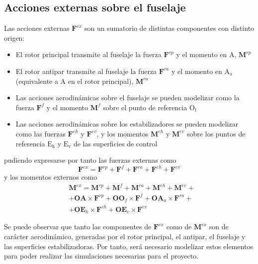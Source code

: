 \subsection{Acciones externas sobre el fuselaje}
Las acciones externas $\mathrm{\textbf{F}}^{ex}$ son un sumatorio de distintas componentes con distinto origen:
\begin{itemize}
	\item El rotor principal transmite al fuselaje la fuerza $\mathrm{\textbf{F}}^{rp}$ y el momento en $\mathrm{A}$, $\mathrm{\textbf{M}}^{rp}$
	\item El rotor antipar transmite al fuselaje la fuerza $\mathrm{\textbf{F}}^{ra}$ y el momento en $\mathrm{A_a}$ (equivalente a A en el rotor principal), $\mathrm{\textbf{M}}^{ra}$
	\item Las acciones aerodinámicas sobre el fuselaje se pueden modelizar como la fuerza $\mathrm{\textbf{F}}^{f}$ y el momento $\mathrm{\textbf{M}}^{f}$ sobre el punto de referencia $\mathrm{O_f}$
	\item Las acciones aerodinámicas sobre los estabilizadores se pueden modelizar como las fuerzas $\mathrm{\textbf{F}}^{eh}$ y $\mathrm{\textbf{F}}^{ev}$, y los momentos $\mathrm{\textbf{M}}^{eh}$ y $\mathrm{\textbf{M}}^{ev}$ sobre los puntos de referencia $\mathrm{E_h}$ y $\mathrm{E_v}$ de las superficies de control
\end{itemize}
pudiendo expresarse por tanto las fuerzas externas como
\begin{equation}
	\mathrm{\textbf{F}}^{ex}=\mathrm{\textbf{F}}^{rp}+\mathrm{\textbf{F}}^{f}+\mathrm{\textbf{F}}^{ra}+\mathrm{\textbf{F}}^{eh}+\mathrm{\textbf{F}}^{ev}
\end{equation}
y los momentos externos como
\begin{equation}
\begin{split}
	&\mathrm{\textbf{M}}^{ex}=\mathrm{\textbf{M}}^{rp}+\mathrm{\textbf{M}}^{f}+\mathrm{\textbf{M}}^{ra}+\mathrm{\textbf{M}}^{eh}+\mathrm{\textbf{M}}^{ev}+ \\
	&+\textbf{OA} \times \mathrm{\textbf{F}}^{rp}+\textbf{O}\textbf{O}_f \times \mathrm{\textbf{F}}^{f}+\textbf{OA}_a \times \mathrm{\textbf{F}}^{ra}+\\
	&+\textbf{OE}_h \times \mathrm{\textbf{F}}^{eh}+\textbf{OE}_v \times \mathrm{\textbf{F}}^{ev}
\end{split}
\end{equation}

Se puede observar que tanto las componentes de $\mathrm{\textbf{F}}^{ex}$ como de $\mathrm{\textbf{M}}^{ex}$ son de carácter aerodinámico, generadas por el rotor principal, el antipar, el fuselaje y las superficies estabilizadoras. Por tanto, será necesario modelizar estos elementos para poder realizar las simulaciones necesarias para el proyecto.

